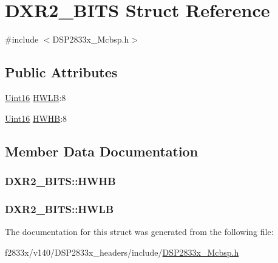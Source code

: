 \hypertarget{struct_d_x_r2___b_i_t_s}{}\section{D\+X\+R2\+\_\+\+B\+I\+T\+S Struct Reference}
\label{struct_d_x_r2___b_i_t_s}


{\ttfamily \#include $<$D\+S\+P2833x\+\_\+\+Mcbsp.\+h$>$}

\subsection*{Public Attributes}
\begin{DoxyCompactItemize}
\item 
\hyperlink{_d_s_p2833x___device_8h_a59a9f6be4562c327cbfb4f7e8e18f08b}{Uint16} \hyperlink{struct_d_x_r2___b_i_t_s_aa145b575ec61863cebe6d8c35fa8ecda}{H\+W\+L\+B}\+:8
\item 
\hyperlink{_d_s_p2833x___device_8h_a59a9f6be4562c327cbfb4f7e8e18f08b}{Uint16} \hyperlink{struct_d_x_r2___b_i_t_s_a98de155b33ccc20ed1cb040bcd5cdcb8}{H\+W\+H\+B}\+:8
\end{DoxyCompactItemize}


\subsection{Member Data Documentation}
\hypertarget{struct_d_x_r2___b_i_t_s_a98de155b33ccc20ed1cb040bcd5cdcb8}{}
\subsubsection[{H\+W\+H\+B}]{ D\+X\+R2\+\_\+\+B\+I\+T\+S\+::\+H\+W\+H\+B}\label{struct_d_x_r2___b_i_t_s_a98de155b33ccc20ed1cb040bcd5cdcb8}
\hypertarget{struct_d_x_r2___b_i_t_s_aa145b575ec61863cebe6d8c35fa8ecda}{}
\subsubsection[{H\+W\+L\+B}]{ D\+X\+R2\+\_\+\+B\+I\+T\+S\+::\+H\+W\+L\+B}\label{struct_d_x_r2___b_i_t_s_aa145b575ec61863cebe6d8c35fa8ecda}


The documentation for this struct was generated from the following file\+:\begin{DoxyCompactItemize}
\item 
f2833x/v140/\+D\+S\+P2833x\+\_\+headers/include/\hyperlink{_d_s_p2833x___mcbsp_8h}{D\+S\+P2833x\+\_\+\+Mcbsp.\+h}\end{DoxyCompactItemize}
